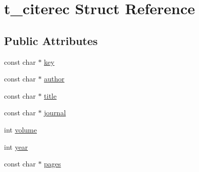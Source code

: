 \hypertarget{structt__citerec}{\section{t\-\_\-citerec \-Struct \-Reference}
\label{structt__citerec}
}
\subsection*{\-Public \-Attributes}
\begin{DoxyCompactItemize}
\item 
const char $\ast$ \hyperlink{structt__citerec_a67c7d4f94cb5d737e7911bd033f4ee65}{key}
\item 
const char $\ast$ \hyperlink{structt__citerec_aade8af951818205d5e00609703750b43}{author}
\item 
const char $\ast$ \hyperlink{structt__citerec_aa71e0c62a2e200272fb5b51f54ec6492}{title}
\item 
const char $\ast$ \hyperlink{structt__citerec_ac7a64e7c201cc4617a00bd32b42a3bc9}{journal}
\item 
int \hyperlink{structt__citerec_affb76404551f2961bef4acccd011c334}{volume}
\item 
int \hyperlink{structt__citerec_a45fccb932cdb8c3a35a4f2d2c42d74cc}{year}
\item 
const char $\ast$ \hyperlink{structt__citerec_a7aa84959d007a6951a3f56ee0b0c2427}{pages}
\end{DoxyCompactItemize}


